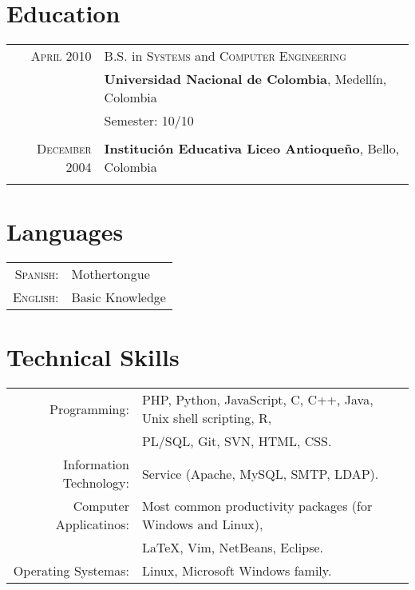 \documentclass[letter,10pt]{article}
\begin{document}
\section{Education}
\begin{tabular}{rl}	
\textsc{April} 2010 & B.S. in \textsc{Systems} and \textsc{Computer Engineering}\\
& \textbf{Universidad Nacional de Colombia}, Medellín, Colombia\\
& Semester: 10/10\\&\\

\textsc{December} 2004 & \textbf{Institución Educativa Liceo Antioqueño}, Bello, Colombia\\&\\

\end{tabular}


\section{Languages}
\begin{tabular}{rl}
 \textsc{Spanish:}&Mothertongue\\
\textsc{English:}&Basic Knowledge\\
\end{tabular}

\section{Technical Skills}
\begin{tabular}{rl}
 Programming:& PHP, Python, JavaScript, C, C++, Java, Unix shell scripting, R,\\
 & PL/SQL, Git, SVN, HTML, CSS.\\
 Information Technology:& Service (Apache, MySQL, SMTP, LDAP).\\
 Computer Applicatinos:& Most common productivity packages (for Windows and Linux),\\
 & \LaTeX, Vim, NetBeans, Eclipse.\\
 Operating Systemas:& Linux, Microsoft Windows family.
\end{tabular}
\end{document}

